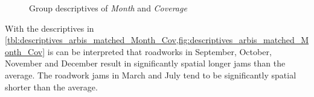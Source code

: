 \begin{figure}[ht!]
	\begin{minipage}{0.55\textwidth}
		\tiny
		\centering
		\vfill
		\label{fig:descriptives_arbis_matched_Month_Cov}
	\end{minipage}%
	\caption{Group descriptives of \textit{Month} and \textit{Coverage}}
\end{figure}
With the descriptives in \cref{tbl:descriptives_arbis_matched_Month_Cov,fig:descriptives_arbis_matched_Month_Cov} is can be interpreted that roadworks in September, October, November and December result in significantly spatial longer jams than the average. The roadwork jams in March and July tend to be significantly spatial shorter than the average.

